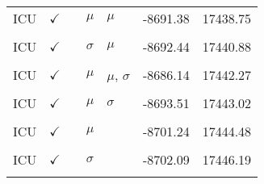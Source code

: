 \begin{table}[!h]
\begin{tabular}[t]{lllllrr}
ICU & $\checkmark$ &  & $\mu$ & $\mu$ & -8691.38 & 17438.75\\
\cellcolor{gray!10}{ICU} & \cellcolor{gray!10}{$\checkmark$} & \cellcolor{gray!10}{} & \cellcolor{gray!10}{$\mu$, $\sigma$} & \cellcolor{gray!10}{$\mu$, $\sigma$} & \cellcolor{gray!10}{-8677.96} & \cellcolor{gray!10}{17439.91}\\
ICU & $\checkmark$ &  & $\sigma$ & $\mu$ & -8692.44 & 17440.88\\
\cellcolor{gray!10}{ICU} & \cellcolor{gray!10}{$\checkmark$} & \cellcolor{gray!10}{} & \cellcolor{gray!10}{$\mu$, $\sigma$} & \cellcolor{gray!10}{$\sigma$} & \cellcolor{gray!10}{-8685.68} & \cellcolor{gray!10}{17441.35}\\
ICU & $\checkmark$ &  & $\mu$ & $\mu$, $\sigma$ & -8686.14 & 17442.27\\
\cellcolor{gray!10}{ICU} & \cellcolor{gray!10}{$\checkmark$} & \cellcolor{gray!10}{} & \cellcolor{gray!10}{} & \cellcolor{gray!10}{$\mu$} & \cellcolor{gray!10}{-8700.25} & \cellcolor{gray!10}{17442.51}\\
ICU & $\checkmark$ &  & $\mu$ & $\sigma$ & -8693.51 & 17443.02\\
\cellcolor{gray!10}{ICU} & \cellcolor{gray!10}{$\checkmark$} & \cellcolor{gray!10}{} & \cellcolor{gray!10}{$\sigma$} & \cellcolor{gray!10}{$\mu$, $\sigma$} & \cellcolor{gray!10}{-8687.15} & \cellcolor{gray!10}{17444.29}\\
ICU & $\checkmark$ &  & $\mu$ &  & -8701.24 & 17444.48\\
\cellcolor{gray!10}{ICU} & \cellcolor{gray!10}{$\checkmark$} & \cellcolor{gray!10}{} & \cellcolor{gray!10}{$\sigma$} & \cellcolor{gray!10}{$\sigma$} & \cellcolor{gray!10}{-8694.51} & \cellcolor{gray!10}{17445.02}\\
ICU & $\checkmark$ &  & $\sigma$ &  & -8702.09 & 17446.19\\
\cellcolor{gray!10}{ICU} & \cellcolor{gray!10}{$\checkmark$} & \cellcolor{gray!10}{} & \cellcolor{gray!10}{} & \cellcolor{gray!10}{$\sigma$} & \cellcolor{gray!10}{-8702.24} & \cellcolor{gray!10}{17446.47}\\
\bottomrule
\end{tabular}
\end{table}

